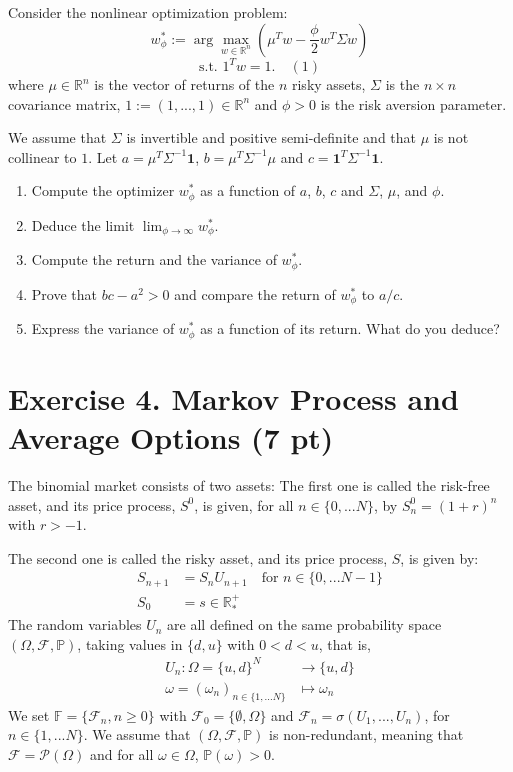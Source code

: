 \documentclass{article}
\begin{document}
Consider the nonlinear optimization problem:
\[ w_{\phi}^{*}:=\arg\max_{w\in\mathbb{R}^{n}}\left(\mu^{T}w-\frac{\phi}{2}w^{T}\Sigma w\right) \]
\[ \text{s.t. } 1^{T}w=1. \quad (1) \]
where $\mu\in\mathbb{R}^{n}$ is the vector of returns of the $n$ risky assets, $\Sigma$ is the $n\times n$ covariance matrix, $1:=(1,...,1)\in\mathbb{R}^{n}$ and $\phi>0$ is the risk aversion parameter.

We assume that $\Sigma$ is invertible and positive semi-definite and that $\mu$ is not collinear to $1$. Let $a=\mu^{T}\Sigma^{-1}\mathbf{1}$, $b=\mu^{T}\Sigma^{-1}\mu$ and $c=\mathbf{1}^{T}\Sigma^{-1}\mathbf{1}$.

\begin{enumerate}
    \item Compute the optimizer $w_{\phi}^{*}$ as a function of $a$, $b$, $c$ and $\Sigma$, $\mu$, and $\phi$.
    \item Deduce the limit $\lim_{\phi\rightarrow\infty}w_{\phi}^{*}$.
    \item Compute the return and the variance of $w_{\phi}^{*}$.
    \item Prove that $bc-a^{2}>0$ and compare the return of $w_{\phi}^{*}$ to $a/c$.
    \item Express the variance of $w_{\phi}^{*}$ as a function of its return. What do you deduce?
\end{enumerate}

\section*{Exercise 4. Markov Process and Average Options (7 pt)}

The binomial market consists of two assets: The first one is called the risk-free asset, and its price process, $S^{0}$, is given, for all $n\in\{0,...N\}$, by $S_{n}^{0}=(1+r)^{n}$ with $r>-1$.

The second one is called the risky asset, and its price process, $S$, is given by:
\begin{align*}
S_{n+1} &= S_{n}U_{n+1} \quad \text{for } n\in\{0,...N-1\} \\
S_{0} &= s\in\mathbb{R}_{*}^{+}
\end{align*}
The random variables $U_{n}$ are all defined on the same probability space $(\Omega, \mathcal{F}, \mathbb{P})$, taking values in $\{d, u\}$ with $0<d<u$, that is,
\begin{align*}
U_{n}:\Omega=\{u,d\}^{N} &\longrightarrow \{u,d\} \\
\omega=(\omega_{n})_{n\in\{1,...N\}} &\mapsto \omega_{n}
\end{align*}
We set $\mathbb{F}=\{\mathcal{F}_{n},n\ge0\}$ with $\mathcal{F}_{0}=\{\emptyset,\Omega\}$ and $\mathcal{F}_{n}=\sigma(U_{1},...,U_{n})$, for $n\in\{1,...N\}$. We assume that $(\Omega, \mathcal{F}, \mathbb{P})$ is non-redundant, meaning that $\mathcal{F}=\mathcal{P}(\Omega)$ and for all $\omega\in\Omega$, $\mathbb{P}(\omega) > 0$.
\end{document}
